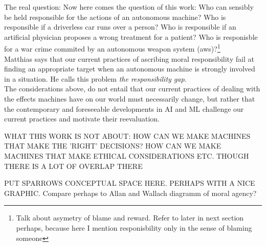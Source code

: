 \documentclass{article}
\begin{document}

The real question:
Now here comes the question of this work: Who can sensibly be held responsible for the
actions of an autonomous machine?
Who is responsible if a driverless car runs over a person? Who is responsible if
an artificial physician proposes a wrong treatment for a patient? Who is
responisble for a war crime commited by an autonomous weapon system
(\acrshort{aws})?\footnote{Talk about asymetry of blame and reward. Refer to
later in next section perhaps, because here I mention responisbility only in the
sense of blaming someone}\\

Matthias says that our current practices of ascribing moral responsibility
fail at finding an appropriate target when an autonomous machine is
strongly involved in a situation. He calls this problem \textit{the
responsibility gap}.\\

The considerations above, do not entail that our current practices of
dealing with the effects machines have on our world must necessarily change,
but rather that the contemporary and foreseeable developments in AI and ML
challenge our current practices and motivate their reevaluation.

WHAT THIS WORK IS NOT ABOUT: HOW CAN WE MAKE MACHINES THAT MAKE THE 'RIGHT'
DECISIONS? HOW CAN WE MAKE MACHINES THAT MAKE ETHICAL CONSIDERATIONS ETC. THOUGH
THERE IS A LOT OF OVERLAP THERE

PUT SPARROWS CONCEPTUAL SPACE HERE. PERHAPS WITH A NICE GRAPHIC. Compare perhaps
to Allan and Wallach diagramm of moral agency?
\end{document}
